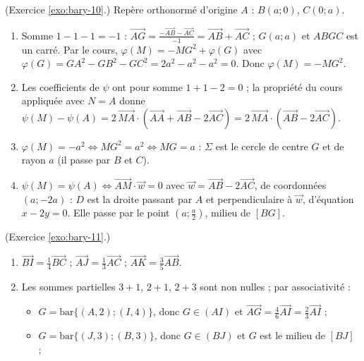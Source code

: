 \begin{corrige}
\begin{sol}
\begin{enumerate}
\begin{itemize}
      \end{itemize}
\end{enumerate}
\end{sol}
%
\begin{sol} (Exercice \ref{exo:bary-10}.)
Rep\`ere orthonorm\'e d'origine $A$ : $B(a;0)$, $C(0;a)$.
\begin{enumerate}
\item Somme $1 - 1 - 1 = -1$ : $\overrightarrow{AG} = \frac{-\overrightarrow{AB} - \overrightarrow{AC}}{-1} = \overrightarrow{AB} + \overrightarrow{AC}$ ;
      $G(a;a)$ et $ABGC$ est un carr\'e. Par le cours, $\varphi(M) = -MG^2 + \varphi(G)$ avec
      $\varphi(G) = GA^2 - GB^2 - GC^2 = 2a^2 - a^2 - a^2 = 0$. Donc $\varphi(M) = -MG^2$.
\item Les coefficients de $\psi$ ont pour somme $1 + 1 - 2 = 0$ ; la propri\'et\'e du cours appliqu\'ee avec $N = A$ donne
      $\psi(M) - \psi(A) = 2\,\overrightarrow{MA}\cdot\left(\overrightarrow{AA} + \overrightarrow{AB} - 2\overrightarrow{AC}\right) = 2\,\overrightarrow{MA}\cdot\left(\overrightarrow{AB} - 2\overrightarrow{AC}\right)$.
\item $\varphi(M) = -a^2 \iff MG^2 = a^2 \iff MG = a$ : $\Sigma$ est le cercle de centre $G$ et de rayon $a$ (il passe par $B$ et $C$).
\item $\psi(M) = \psi(A) \iff \overrightarrow{AM}\cdot\vec{w} = 0$ avec $\vec{w} = \overrightarrow{AB} - 2\overrightarrow{AC}$, de coordonn\'ees $(a ; -2a)$ :
      $D$ est la droite passant par $A$ et perpendiculaire \`a $\vec{w}$, d'\'equation $x - 2y = 0$.
      Elle passe par le point $(a ; \frac{a}{2})$, milieu de $[BG]$.
\end{enumerate}
\end{sol}
%
\begin{sol} (Exercice \ref{exo:bary-11}.)
\begin{enumerate}
\item $\overrightarrow{BI} = \frac{1}{4}\overrightarrow{BC}$ ; $\overrightarrow{AJ} = \frac{1}{3}\overrightarrow{AC}$ ; $\overrightarrow{AK} = \frac{3}{5}\overrightarrow{AB}$.
\item Les sommes partielles $3+1$, $2+1$, $2+3$ sont non nulles ; par associativit\'e :
      \begin{itemize}
      \item $G = \mathrm{bar}\{(A,2);(I,4)\}$, donc $G\in(AI)$ et $\overrightarrow{AG} = \frac{4}{6}\overrightarrow{AI} = \frac{2}{3}\overrightarrow{AI}$ ;
      \item $G = \mathrm{bar}\{(J,3);(B,3)\}$, donc $G\in(BJ)$ et $G$ est le milieu de $[BJ]$ ;

\end{itemize}
\end{enumerate}
\end{sol}
\end{corrige}
